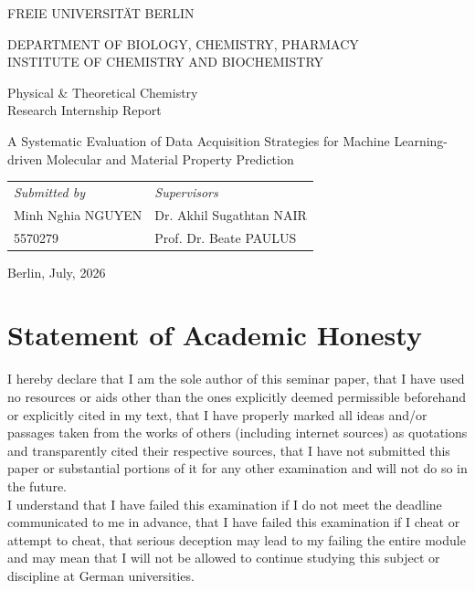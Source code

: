 


	\thispagestyle{empty}
	
	\begin{titlepage}
		\centering
		\vspace*{1cm}
		
		{\Large FREIE UNIVERSITÄT BERLIN}\\
		
		{\large DEPARTMENT OF BIOLOGY, CHEMISTRY, PHARMACY\\
		INSTITUTE OF CHEMISTRY AND BIOCHEMISTRY\par}
		\vspace{2cm}
		
		{\large Physical \& Theoretical Chemistry \\
		Research Internship Report\par}
		\vspace{4cm}
		
		{\huge A Systematic Evaluation of Data Acquisition Strategies for Machine Learning-driven Molecular and Material Property Prediction}
		\vspace{6cm}				

		\begin{tabularx}{\textwidth}{XX}
			\textit{Submitted by} & \textit{Supervisors}\\
			Minh Nghia NGUYEN & Dr. Akhil Sugathtan NAIR\\
			5570279 & Prof. Dr. Beate PAULUS
		\end{tabularx}
		\vfill
		
		Berlin, July, 2026
	\end{titlepage}
	
	\normalsize
	
	\section*{Statement of Academic Honesty}
		I hereby declare that I am the sole author of this seminar paper, that I have used no
		resources or aids other than the ones explicitly deemed permissible beforehand or
		explicitly cited in my text, that I have properly marked all ideas and/or passages taken
		from the works of others (including internet sources) as quotations and transparently
		cited their respective sources, that I have not submitted this paper or substantial
		portions of it for any other examination and will not do so in the future.\\
		
		I understand that I have failed this examination if I do not meet the deadline
		communicated to me in advance, that I have failed this examination if I cheat or
		attempt to cheat, that serious deception may lead to my failing the entire module and
		may mean that I will not be allowed to continue studying this subject or discipline at
		German universities.\\
		\vspace{1cm}
		
